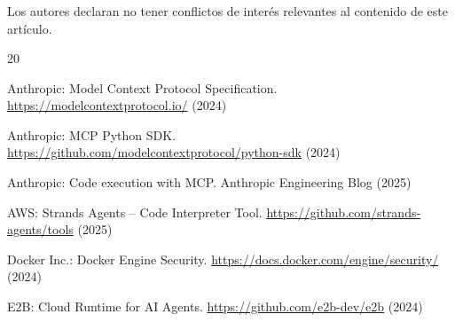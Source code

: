 \documentclass[runningheads]{llncs}
\begin{document}
%
\begin{credits}
\subsubsection{\ackname}

\subsubsection{\discintname}
Los autores declaran no tener conflictos de inter\'es relevantes al contenido
de este art\'iculo.
\end{credits}
%
%

% 
%
\begin{thebibliography}{20}

Anthropic: Model Context Protocol Specification.
\url{https://modelcontextprotocol.io/} (2024)

Anthropic: MCP Python SDK.
\url{https://github.com/modelcontextprotocol/python-sdk} (2024)

Anthropic: Code execution with MCP. Anthropic Engineering Blog (2025)

AWS: Strands Agents -- Code Interpreter Tool.
\url{https://github.com/strands-agents/tools} (2025)

Docker Inc.: Docker Engine Security.
\url{https://docs.docker.com/engine/security/} (2024)

E2B: Cloud Runtime for AI Agents.
\url{https://github.com/e2b-dev/e2b} (2024)


\end{thebibliography}
%
\end{document}

